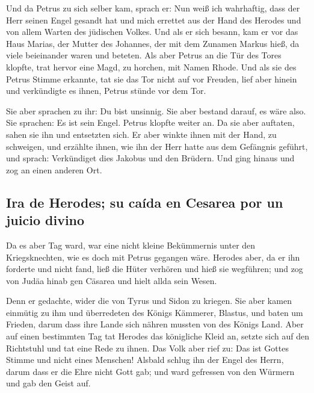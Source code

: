  Und da Petrus zu sich selber kam, sprach er: Nun weiß
ich wahrhaftig, dass der Herr seinen Engel gesandt hat und mich errettet
aus der Hand des Herodes und von allem Warten des jüdischen Volkes.
 Und als er sich besann, kam er vor das Haus Marias, der
Mutter des Johannes, der mit dem Zunamen Markus hieß, da viele
beieinander waren und beteten.  Als aber Petrus an die
Tür des Tores klopfte, trat hervor eine Magd, zu horchen, mit Namen
Rhode.  Und als sie des Petrus Stimme erkannte, tat sie
das Tor nicht auf vor Freuden, lief aber hinein und verkündigte es
ihnen, Petrus stünde vor dem Tor.

 Sie aber sprachen zu ihr: Du bist unsinnig. Sie aber
bestand darauf, es wäre also. Sie sprachen: Es ist sein Engel.
 Petrus klopfte weiter an. Da sie aber auftaten, sahen
sie ihn und entsetzten sich.  Er aber winkte ihnen mit
der Hand, zu schweigen, und erzählte ihnen, wie ihn der Herr hatte aus
dem Gefängnis geführt, und sprach: Verkündiget dies Jakobus und den
Brüdern. Und ging hinaus und zog an einen anderen Ort.

\hypertarget{ira-de-herodes-su-cauxedda-en-cesarea-por-un-juicio-divino}{%
\subsection{Ira de Herodes; su caída en Cesarea por un juicio
divino}\label{ira-de-herodes-su-cauxedda-en-cesarea-por-un-juicio-divino}}

 Da es aber Tag ward, war eine nicht kleine Bekümmernis
unter den Kriegsknechten, wie es doch mit Petrus gegangen wäre.
 Herodes aber, da er ihn forderte und nicht fand, ließ
die Hüter verhören und hieß sie wegführen; und zog von Judäa hinab gen
Cäsarea und hielt allda sein Wesen.

 Denn er gedachte, wider die von Tyrus und Sidon zu
kriegen. Sie aber kamen einmütig zu ihm und überredeten des Königs
Kämmerer, Blastus, und baten um Frieden, darum dass ihre Lande sich
nähren mussten von des Königs Land.  Aber auf einen
bestimmten Tag tat Herodes das königliche Kleid an, setzte sich auf den
Richtstuhl und tat eine Rede zu ihnen.  Das Volk aber
rief zu: Das ist Gottes Stimme und nicht eines Menschen! 
Alsbald schlug ihn der Engel des Herrn, darum dass er die Ehre nicht
Gott gab; und ward gefressen von den Würmern und gab den Geist auf.

